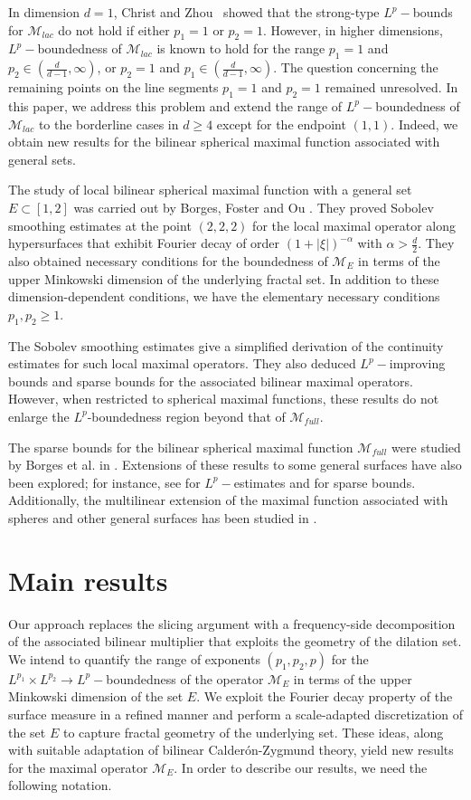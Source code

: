 \documentclass[a4paper,reqno]{amsart}
\newcounter{old}
\numberwithin{equation}{section}
\begin{document}
	In dimension $d=1$, Christ and Zhou~\cite{ChristZhou} showed that the strong-type $L^p-$bounds for $\mathcal{M}_{lac}$ do not hold if either $p_1=1$ or $p_2=1$. However, in higher dimensions, $L^p-$boundedness of $\mathcal{M}_{lac}$ is known to hold for the range $p_1=1$ and $p_2\in(\frac{d}{d-1},\infty)$, or $p_2=1$ and $p_1\in(\frac{d}{d-1},\infty)$. The question concerning the remaining points on the line segments $p_1=1$ and $p_2=1$ remained unresolved. In this paper, we address this problem and extend the range of $L^p-$boundedness of $\mathcal{M}_{lac}$ to the borderline cases in  $d\geq4$ except for the endpoint $(1,1)$. Indeed, we obtain new results for the bilinear spherical maximal function associated with general sets.
	
	The study of local bilinear spherical maximal function with a general set $E\subset[1,2]$ was carried out by Borges, Foster and Ou \cite{BFO}. They proved Sobolev smoothing estimates at the point $(2,2,2)$ for the local maximal operator along hypersurfaces that exhibit Fourier decay of order $(1+|\xi|)^{-\alpha}$ with $\alpha>\frac{d}{2}$. They also obtained necessary conditions for the boundedness of $\mathcal{M}_E$ in terms of the upper Minkowski dimension of the underlying fractal set. In addition to these dimension-dependent conditions, we have the elementary necessary conditions $p_1,p_2\geq1$.
	
	The Sobolev smoothing estimates give a simplified derivation of the continuity estimates for such local maximal operators. They also deduced $L^p-$improving bounds and sparse bounds for the associated bilinear maximal operators. However, when restricted to spherical maximal functions, these results do not enlarge the $L^p$-boundedness region beyond that of $\mathcal M_{full}$.
	
	The sparse bounds for the bilinear spherical maximal function $\mathcal{M}_{full}$ were studied by Borges et al. in \cite{BFOPZ}. Extensions of these results to some general surfaces have also been explored; for instance, see \cites{CGHHS, LS} for $L^p-$estimates and \cites{RSS, PS} for sparse bounds. Additionally, the multilinear extension of the maximal function associated with spheres and other general surfaces has been studied in \cites{Dosidis, SS, GHHP, CLS, Gao}.
	\section{Main results}\label{sec:results}
	Our approach replaces the slicing argument with a frequency-side decomposition of the associated bilinear multiplier that exploits the geometry of the dilation set. We intend to quantify the range of exponents $(p_1, p_2, p)$ for the $L^{p_1}\times L^{p_2}\rightarrow L^p-$boundedness of the operator $\mathcal M_E$ in terms of the upper Minkowski dimension of the set $E$. We exploit the Fourier decay property of the surface measure in a refined manner and perform a scale-adapted discretization of the set $E$ to capture fractal geometry of the underlying set. These ideas, along with suitable adaptation of bilinear Calder\'{o}n-Zygmund theory, yield new results for the maximal operator $\mathcal M_E$. In order to describe our results, we need the following notation.
	
\end{document}
